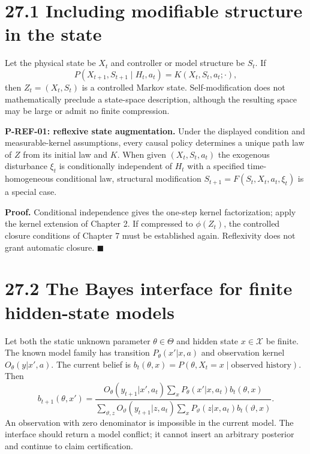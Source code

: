 \documentclass[
  english,
  11pt,
  oneside]{book}
\begin{document}
\section{27.1 Including modifiable structure in the state}\label{including-modifiable-structure-in-the-state}

Let the physical state be \(X_t\) and controller or model structure be \(S_t\). If \[P(X_{t+1},S_{t+1}\mid H_t,a_t)
=K(X_t,S_t,a_t;\cdot),\] then \(Z_t=(X_t,S_t)\) is a controlled Markov state. Self-modification does not mathematically preclude a state-space description, although the resulting space may be large or admit no finite compression.

\hypertarget{p-ref-01}{}\label{p-ref-01}

\textbf{P-REF-01: reflexive state augmentation.} Under the displayed condition and measurable-kernel assumptions, every causal policy determines a unique path law of \(Z\) from its initial law and \(K\). When given \((X_t,S_t,a_t)\) the exogenous disturbance \(\xi_t\) is conditionally independent of \(H_t\) with a specified time-homogeneous conditional law, structural modification \(S_{t+1}=F(S_t,X_t,a_t,\xi_t)\) is a special case.

\textbf{Proof.} Conditional independence gives the one-step kernel factorization; apply the kernel extension of Chapter 2. If compressed to \(\phi(Z_t)\), the controlled closure conditions of Chapter 7 must be established again. Reflexivity does not grant automatic closure. \(\blacksquare\)

\section{27.2 The Bayes interface for finite hidden-state models}\label{the-bayes-interface-for-finite-hidden-state-models}

Let both the static unknown parameter \(\theta\in\Theta\) and hidden state \(x\in\mathcal X\) be finite. The known model family has transition \(P_\theta(x'|x,a)\) and observation kernel \(O_\theta(y|x',a)\). The current belief is \(b_t(\theta,x)=P(\theta,X_t=x\mid\text{observed history})\). Then \[b_{t+1}(\theta,x')=
\frac{O_\theta(y_{t+1}|x',a_t)
\sum_xP_\theta(x'|x,a_t)b_t(\theta,x)}
{\sum_{\vartheta,z}O_\vartheta(y_{t+1}|z,a_t)
\sum_xP_\vartheta(z|x,a_t)b_t(\vartheta,x)}.\] An observation with zero denominator is impossible in the current model. The interface should return a model conflict; it cannot insert an arbitrary posterior and continue to claim certification.
\end{document}

